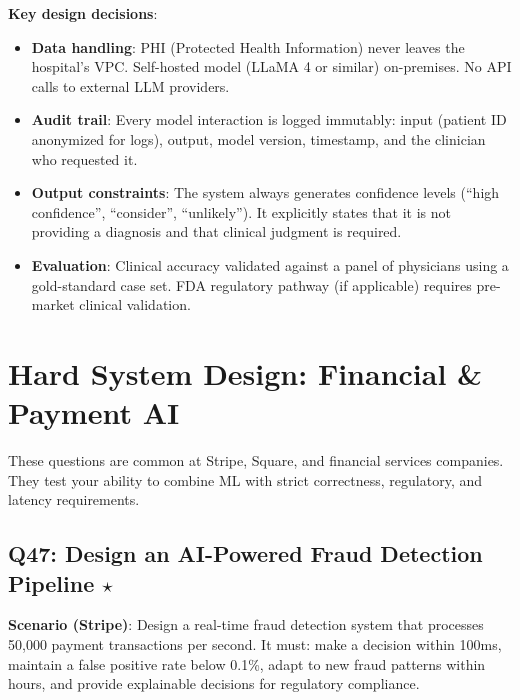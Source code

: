 \textbf{Key design decisions}:
\begin{itemize}[leftmargin=*]
    \item \textbf{Data handling}: PHI (Protected Health Information) never leaves the hospital's VPC. Self-hosted model (LLaMA 4 or similar) on-premises. No API calls to external LLM providers.
    \item \textbf{Audit trail}: Every model interaction is logged immutably: input (patient ID anonymized for logs), output, model version, timestamp, and the clinician who requested it.
    \item \textbf{Output constraints}: The system always generates confidence levels (``high confidence'', ``consider'', ``unlikely''). It explicitly states that it is not providing a diagnosis and that clinical judgment is required.
    \item \textbf{Evaluation}: Clinical accuracy validated against a panel of physicians using a gold-standard case set. FDA regulatory pathway (if applicable) requires pre-market clinical validation.
\end{itemize}


\section{Hard System Design: Financial \& Payment AI}
\label{sec:hard-financial}

These questions are common at Stripe, Square, and financial services companies. They test your ability to combine ML with strict correctness, regulatory, and latency requirements.

\subsection{Q47: Design an AI-Powered Fraud Detection Pipeline $\star$}

\textbf{Scenario (Stripe)}: Design a real-time fraud detection system that processes 50,000 payment transactions per second. It must: make a decision within 100ms, maintain a false positive rate below 0.1\%, adapt to new fraud patterns within hours, and provide explainable decisions for regulatory compliance.

